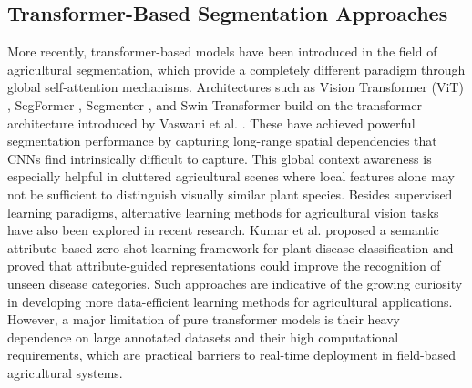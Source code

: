 \documentclass[pdflatex,sn-mathphys-num]{sn-jnl}
\begin{document}
\subsection{Transformer-Based Segmentation Approaches}
More recently, transformer-based models have been introduced in the field of agricultural segmentation, which provide a completely different paradigm through global self-attention mechanisms.
Architectures such as Vision Transformer (ViT)
\cite{dosovitskiy2021vit}, SegFormer
\cite{xie2021segformer}, Segmenter
\cite{strudel2021segmenter}, and Swin Transformer
\cite{liu2021swin} build on the transformer
architecture introduced by Vaswani et al.
\cite{vaswani2017attention}. These have achieved powerful segmentation performance by capturing long-range spatial dependencies that CNNs find intrinsically difficult to capture. This global context awareness is especially helpful in cluttered agricultural scenes where local features alone may not be sufficient to distinguish visually similar plant species. Besides supervised learning paradigms, alternative learning methods for agricultural vision tasks have also been explored in recent research. Kumar et al. \cite{kumar2024zeroshot} proposed a semantic attribute-based zero-shot learning framework for plant disease classification and proved that attribute-guided representations could improve the recognition of unseen disease categories. Such approaches are indicative of the growing curiosity in developing more data-efficient learning methods for agricultural applications. However, a major limitation of pure transformer models is their heavy dependence on large annotated datasets and their high computational requirements, which are practical barriers to real-time deployment in field-based agricultural systems.
\end{document}
